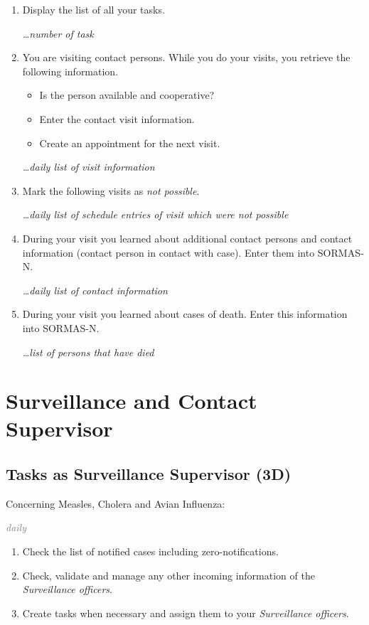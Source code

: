 \documentclass[a4paper, titlepage]{tufte-handout}
\begin{document}
\begin{enumerate}
\item Display the list of all your tasks.

\emph{\ldots number of task}

\item You are visiting contact persons. While you do your visits, you retrieve the following information.

\begin{itemize}
\item Is the person available and cooperative?

\item Enter the contact visit information.

\item Create an appointment for the next visit.
\end{itemize}
\emph{\ldots daily list of visit information}

\item Mark the following visits as \emph{not possible}.

\emph{\ldots daily list of schedule entries of visit which were not possible}

\item During your visit you learned about additional contact persons and contact information (contact person in contact with case). Enter them into SORMAS-N.

\emph{\ldots daily list of contact information}

\item During your visit you learned about cases of death. Enter this information into SORMAS-N.

\emph{\ldots list of persons that have died}
\end{enumerate}

\section{Surveillance and Contact Supervisor}
\label{sec-6}

\subsection{Tasks as Surveillance Supervisor (3D)}
\label{sec-6-1}

Concerning Measles, Cholera and Avian Influenza\footnotemark[11]{}:

\emph{\textcolor{gray}{daily}}

\begin{enumerate}
\item Check the list of notified cases including zero-notifications.

\item Check, validate and manage any other incoming information of the \emph{Surveillance officers}.

\item Create tasks when necessary and assign them to your \emph{Surveillance officers}.
\end{enumerate}
\end{document}
